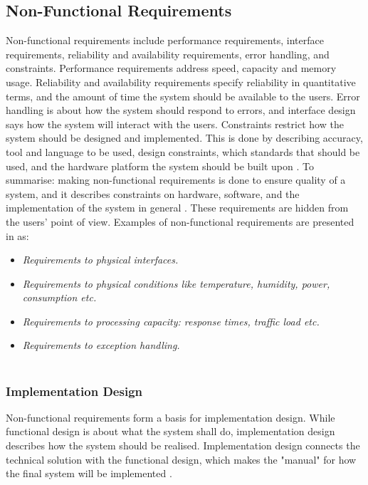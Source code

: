 \subsection{Non-Functional Requirements}
Non-functional requirements include performance requirements, interface requirements, reliability and availability requirements, error handling, and constraints. Performance requirements address speed, capacity and memory usage. Reliability and availability requirements specify reliability in quantitative terms, and the amount of time the system should be available to the users. Error handling is about how the system should respond to errors, and interface design says how the system will interact with the users. Constraints restrict how the system should be designed and implemented. This is done by describing accuracy, tool and language to be used, design constraints, which standards that should be used, and the hardware platform the system should be built upon \cite{braude2000software}. To summarise: making non-functional requirements is done to ensure quality of a system, and it describes constraints on hardware, software, and the implementation of the system in general \cite{mmi}. These requirements are hidden from the users' point of view. Examples of non-functional requirements are presented in \cite{systemutviklingDel1} as:
\begin{itemize}
\item \emph{Requirements to physical interfaces.}
\item \emph{Requirements to physical conditions like temperature, humidity, power, consumption etc.}
\item \emph{Requirements to processing capacity: response times, traffic load etc.}
\item \emph{Requirements to exception handling.} \\ \\ 
\end{itemize}   

\subsubsection{Implementation Design}
Non-functional requirements form a basis for implementation design. While functional design is about what the system shall do, implementation design describes how the system should be realised. Implementation design connects the technical solution with the functional design, which makes the "manual" for how the final system will be implemented \cite{systemutviklingDel1}.  

